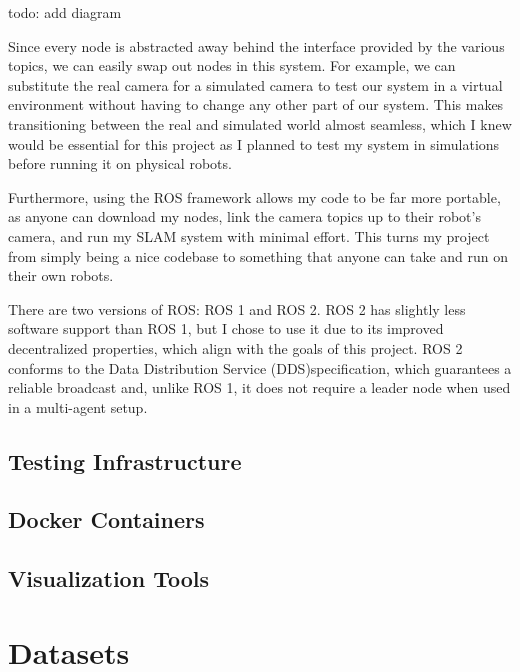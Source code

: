 todo: add diagram

Since every node is abstracted away behind the interface provided by the various topics, we can easily swap out nodes in this system. For example, we can substitute the real camera for a simulated camera to test our system in a virtual environment without having to change any other part of our system. This makes transitioning between the real and simulated world almost seamless, which I knew would be essential for this project as I planned to test my system in simulations before running it on physical robots.

Furthermore, using the ROS framework allows my code to be far more portable, as anyone can download my nodes, link the camera topics up to their robot's camera, and run my SLAM system with minimal effort. This turns my project from simply being a nice codebase to something that anyone can take and run on their own robots.

There are two versions of ROS: ROS 1 and ROS 2. ROS 2 has slightly less software support than ROS 1, but I chose to use it due to its improved decentralized properties, which align with the goals of this project. ROS 2 conforms to the Data Distribution Service (DDS)\footnotemark[1] specification, which guarantees a reliable broadcast and, unlike ROS 1, it does not require a leader node when used in a multi-agent setup.


\subsection{Testing Infrastructure}
\label{sec:testing-infrastructure}

\subsection{Docker Containers}
\label{sec:docker-containers}

\subsection{Visualization Tools}
\label{sec:visualization-tools}

\section{Datasets}
\label{sec:datasets}

